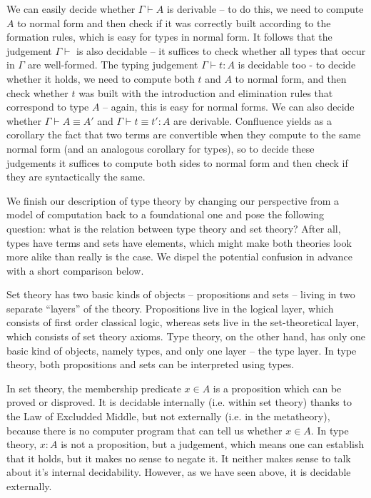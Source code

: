 \documentclass[declaration,mgr,english,shortabstract]{iithesis}
\newcommand{\context}[1]{#1 \vdash}
\newcommand{\type}[2]{#1 \vdash #2}
\newcommand{\typeconv}[3]{#1 \vdash #2 \equiv #3}
\newcommand{\term}[3]{#1 \vdash #2 : #3}
\newcommand{\termconv}[4]{#1 \vdash #2 \equiv #3 : #4}
\begin{document}
We can easily decide whether $\type{\Gamma}{A}$ is derivable -- to do this, we need to compute $A$ to normal form and then check if it was correctly built according to the formation rules, which is easy for types in normal form. It follows that the judgement $\context{\Gamma}$ is also decidable -- it suffices to check whether all types that occur in $\Gamma$ are well-formed. The typing judgement $\term{\Gamma}{t}{A}$ is decidable too - to decide whether it holds, we need to compute both $t$ and $A$ to normal form, and then check whether $t$ was built with the introduction and elimination rules that correspond to type $A$ -- again, this is easy for normal forms. We can also decide whether $\typeconv{\Gamma}{A}{A'}$ and $\termconv{\Gamma}{t}{t'}{A}$ are derivable. Confluence yields as a corollary the fact that two terms are convertible when they compute to the same normal form (and an analogous corollary for types), so to decide these judgements it suffices to compute both sides to normal form and then check if they are syntactically the same.

We finish our description of type theory by changing our perspective from a model of computation back to a foundational one and pose the following question: what is the relation between type theory and set theory? After all, types have terms and sets have elements, which might make both theories look more alike than really is the case. We dispel the potential confusion in advance with a short comparison below.

Set theory has two basic kinds of objects -- propositions and sets -- living in two separate ``layers'' of the theory. Propositions live in the logical layer, which consists of first order classical logic, whereas sets live in the set-theoretical layer, which consists of set theory axioms. Type theory, on the other hand, has only one basic kind of objects, namely types, and only one layer -- the type layer. In type theory, both propositions and sets can be interpreted using types.

In set theory, the membership predicate $x \in A$ is a proposition which can be proved or disproved. It is decidable internally (i.e. within set theory) thanks to the Law of Excludded Middle, but not externally (i.e. in the metatheory), because there is no computer program that can tell us whether $x \in A$. In type theory, $x : A$ is not a proposition, but a judgement, which means one can establish that it holds, but it makes no sense to negate it. It neither makes sense to talk about it's internal decidability. However, as we have seen above, it is decidable externally.
\end{document}
